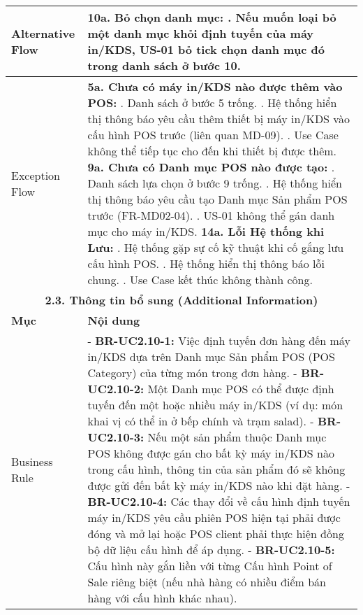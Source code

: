 \begin{longtable}{|m{4cm}|p{11cm}|}
\hline
Alternative Flow & \textbf{10a. Bỏ chọn danh mục:} \newline    1. Nếu muốn loại bỏ một danh mục khỏi định tuyến của máy in/KDS, US-01 bỏ tick chọn danh mục đó trong danh sách ở bước 10. \\
\hline
Exception Flow & \textbf{5a. Chưa có máy in/KDS nào được thêm vào POS:} \newline    1. Danh sách ở bước 5 trống. \newline    2. Hệ thống hiển thị thông báo yêu cầu thêm thiết bị máy in/KDS vào cấu hình POS trước (liên quan MD-09). \newline    3. Use Case không thể tiếp tục cho đến khi thiết bị được thêm. \newline \textbf{9a. Chưa có Danh mục POS nào được tạo:} \newline    1. Danh sách lựa chọn ở bước 9 trống. \newline    2. Hệ thống hiển thị thông báo yêu cầu tạo Danh mục Sản phẩm POS trước (FR-MD02-04). \newline    3. US-01 không thể gán danh mục cho máy in/KDS. \newline \textbf{14a. Lỗi Hệ thống khi Lưu:} \newline    1. Hệ thống gặp sự cố kỹ thuật khi cố gắng lưu cấu hình POS. \newline    2. Hệ thống hiển thị thông báo lỗi chung. \newline    3. Use Case kết thúc không thành công. \\
\hline
\multicolumn{2}{|c|}{\textbf{2.3. Thông tin bổ sung (Additional Information)}} \\
\hline
\textbf{Mục} & \textbf{Nội dung} \\
\hline
Business Rule & - \textbf{BR-UC2.10-1:} Việc định tuyến đơn hàng đến máy in/KDS dựa trên Danh mục Sản phẩm POS (POS Category) của từng món trong đơn hàng. \newline - \textbf{BR-UC2.10-2:} Một Danh mục POS có thể được định tuyến đến một hoặc nhiều máy in/KDS (ví dụ: món khai vị có thể in ở bếp chính và trạm salad). \newline - \textbf{BR-UC2.10-3:} Nếu một sản phẩm thuộc Danh mục POS không được gán cho bất kỳ máy in/KDS nào trong cấu hình, thông tin của sản phẩm đó sẽ không được gửi đến bất kỳ máy in/KDS nào khi đặt hàng. \newline - \textbf{BR-UC2.10-4:} Các thay đổi về cấu hình định tuyến máy in/KDS yêu cầu phiên POS hiện tại phải được đóng và mở lại hoặc POS client phải thực hiện đồng bộ dữ liệu cấu hình để áp dụng. \newline - \textbf{BR-UC2.10-5:} Cấu hình này gắn liền với từng Cấu hình Point of Sale riêng biệt (nếu nhà hàng có nhiều điểm bán hàng với cấu hình khác nhau). \\

\end{longtable}
